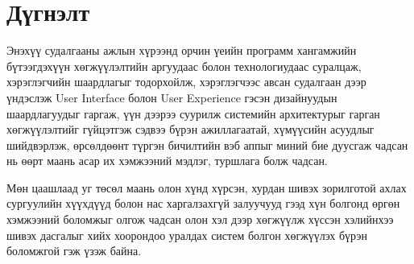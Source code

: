 \chapter{Дүгнэлт}

Энэхүү судалгааны ажлын хүрээнд орчин үеийн программ хангамжийн бүтээгдэхүүн хөгжүүлэлтийн аргуудаас болон технологиудаас суралцаж, хэрэглэгчийн шаардлагыг тодорхойлж, хэрэглэгчээс авсан судалгаан дээр үндэслэж User Interface болон User Experience гэсэн дизайнуудын шаардлагуудыг гаргаж, үүн дээрээ суурилж системийн архитектурыг гарган хөгжүүлэлтийг гүйцэтгэж сэдвээ бүрэн ажиллагаатай, хүмүүсийн асуудлыг шийдвэрлэж, өрсөлдөөнт түргэн бичилтийн вэб аппыг миний бие дуусгаж чадсан нь өөрт маань асар их хэмжээний мэдлэг, туршлага болж чадсан.

Мөн цаашлаад уг төсөл маань олон хүнд хүрсэн, хурдан шивэх зорилготой ахлах сургуулийн хүүхдүүд болон нас харгалзахгүй залуучууд гээд хүн болгонд өргөн хэмжээний боломжыг олгож чадсан олон хэл дээр хөгжүүлж хүссэн хэлийнхээ шивэх дасгалыг хийх хоорондоо уралдах систем болгон хөгжүүлэх бүрэн боломжгой гэж үзэж байна.